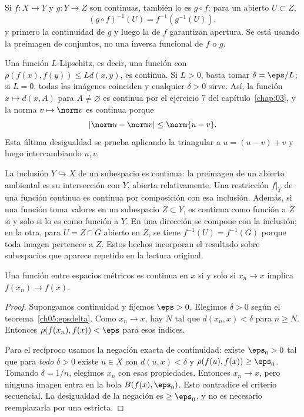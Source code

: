 Si $f:X\to Y$ y $g:Y\to Z$ son continuas, también lo es $g\circ f$: para un abierto $U\subset Z$,
\[
(g\circ f)^{-1}(U)=f^{-1}(g^{-1}(U)),
\]
y primero la continuidad de $g$ y luego la de $f$ garantizan apertura. Se está usando la preimagen de conjuntos, no una inversa funcional de $f$ o $g$.

Una función $L$-Lipschitz, es decir, una función con $\rho(f(x),f(y))\le Ld(x,y)$, es continua. Si $L>0$, basta tomar $\delta=\eps/L$; si $L=0$, todas las imágenes coinciden y cualquier $\delta>0$ sirve. Así, la función $x\mapsto d(x,A)$ para $A\ne\varnothing$ es continua por el ejercicio 7 del capítulo~\ref{chap:03}, y la norma $v\mapsto\norm v$ es continua porque
\[
|\norm u-\norm v|\le\norm{u-v}.
\]
Esta última desigualdad se prueba aplicando la triangular a $u=(u-v)+v$ y luego intercambiando $u,v$.

La inclusión $Y\hookrightarrow X$ de un subespacio es continua: la preimagen de un abierto ambiental es su intersección con $Y$, abierta relativamente. Una restricción $f|_Y$ de una función continua es continua por composición con esa inclusión. Además, si una función toma valores en un subespacio $Z\subset Y$, es continua como función a $Z$ si y solo si lo es como función a $Y$. En una dirección se compone con la inclusión; en la otra, para $U=Z\cap G$ abierto en $Z$, se tiene $f^{-1}(U)=f^{-1}(G)$ porque toda imagen pertenece a $Z$. Estos hechos incorporan el resultado sobre subespacios que aparece repetido en la lectura original.

\begin{teorema}\label{ch05:secuencial}
Una función entre espacios métricos es continua en $x$ si y solo si $x_n\to x$ implica $f(x_n)\to f(x)$.
\end{teorema}
\begin{proof}
Supongamos continuidad y fijemos $\eps>0$. Elegimos $\delta>0$ según el teorema~\ref{ch05:epsdelta}. Como $x_n\to x$, hay $N$ tal que $d(x_n,x)<\delta$ para $n\ge N$. Entonces $\rho(f(x_n),f(x))<\eps$ para esos índices.

Para el recíproco usamos la negación exacta de continuidad: existe $\eps_0>0$ tal que para \emph{todo} $\delta>0$ existe $u\in X$ con $d(u,x)<\delta$ y $\rho(f(u),f(x))\ge\eps_0$. Tomando $\delta=1/n$, elegimos $x_n$ con esas propiedades. Entonces $x_n\to x$, pero ninguna imagen entra en la bola $B(f(x),\eps_0)$. Esto contradice el criterio secuencial. La desigualdad de la negación es $\ge\eps_0$, y no es necesario reemplazarla por una estricta.
\end{proof}

